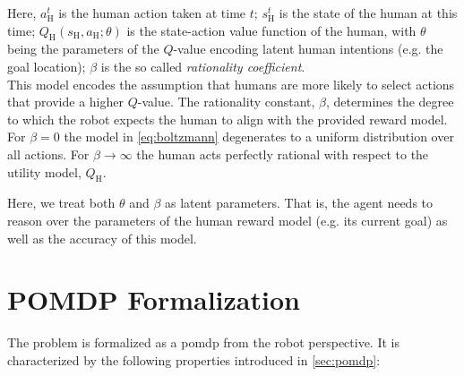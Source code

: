 Here, $a^t_\text{H}$ is the human action taken at time $t$; $s^t_\text{H}$ is
the state of the human at this time; $Q_\text{H}(s_\text{H}, a_\text{H}; \theta)$ is the
state-action value function of the human, with $\theta$ being the parameters of the
$Q$-value encoding latent human intentions (e.g. the goal location); $\beta$ is
the so called \emph{rationality coefficient}.\\
This model encodes the assumption that humans are more likely to select actions that
provide a higher $Q$-value. The rationality constant, $\beta$, determines the
degree to which the robot expects the human to align with the provided reward
model. For $\beta = 0$ the model in \cref{eq:boltzmann} degenerates to
a uniform distribution over all actions. For $\beta \to \infty$ the human acts
perfectly rational with respect to the utility model,
$Q_\text{H}$.

Here, we treat both $\theta$ and $\beta$ as latent parameters. That is, the
agent needs to reason over the parameters of the human reward model (e.g. its
current goal) as well as the accuracy of this model.

\section{POMDP Formalization}\label{sec:hri-pomdp-formalization}

The problem is formalized as a \ac{pomdp} from the robot perspective. It is
characterized by the following properties introduced in \cref{sec:pomdp}:

